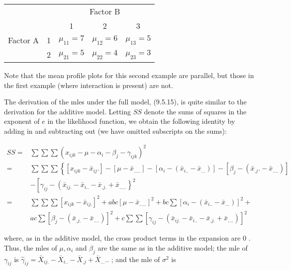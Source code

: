 \begin{center}
\begin{tabular}{|cc|ccc|}
\hline
 &  & \multicolumn{3}{|c|}{Factor B} \\
 &  & 1 & 2 & 3 \\
\hline
Factor A & 1 & $\mu_{11}=7$ & $\mu_{12}=6$ & $\mu_{13}=5$ \\
 & 2 & $\mu_{21}=5$ & $\mu_{22}=4$ & $\mu_{23}=3$ \\
\hline
\end{tabular}
\end{center}

Note that the mean profile plots for this second example are parallel, but those in the first example (where interaction is present) are not.

The derivation of the mles under the full model, (9.5.15), is quite similar to the derivation for the additive model. Letting $S S$ denote the sums of squares in the exponent of $e$ in the likelihood function, we obtain the following identity by adding in and subtracting out (we have omitted subscripts on the sums):


\begin{align*}
S S= & \sum \sum \sum\left(x_{i j k}-\mu-\alpha_{i}-\beta_{j}-\gamma_{i j k}\right)^{2} \\
= & \sum \sum \sum\left\{\left[x_{i j k}-\bar{x}_{i j} .\right]-\left[\mu-\bar{x}_{\ldots . .}\right]-\left[\alpha_{i}-\left(\bar{x}_{i . .}-\bar{x}_{\ldots}\right)\right]-\left[\beta_{j}-\left(\bar{x}_{. j} .-\bar{x}_{\ldots .}\right)\right]\right. \\
& -\left[\gamma_{i j}-\left(\bar{x}_{i j .}-\bar{x}_{i . .}-\bar{x}_{. j .}+\bar{x}_{\ldots . .}\right\}^{2}\right. \\
= & \sum \sum \sum\left[x_{i j k}-\bar{x}_{i j .}\right]^{2}+a b c\left[\mu-\bar{x}_{\ldots . .}\right]^{2}+b c \sum\left[\alpha_{i}-\left(\bar{x}_{i . .}-\bar{x}_{\ldots}\right)\right]^{2}+ \\
& a c \sum\left[\beta_{j}-\left(\bar{x}_{. j .}-\bar{x}_{\ldots .}\right)\right]^{2}+c \sum \sum\left[\gamma_{i j}-\left(\bar{x}_{i j .}-\bar{x}_{i . .}-\bar{x}_{. j .}+\bar{x}_{\ldots .}\right)\right]^{2} \tag{9.5.16}
\end{align*}


where, as in the additive model, the cross product terms in the expansion are 0 . Thus, the mles of $\mu, \alpha_{i}$ and $\beta_{j}$ are the same as in the additive model; the mle of $\gamma_{i j}$ is $\hat{\gamma}_{i j}=\bar{X}_{i j .}-\bar{X}_{i . .}-\bar{X}_{. j}+\bar{X}_{\ldots} .$. ; and the mle of $\sigma^{2}$ is



